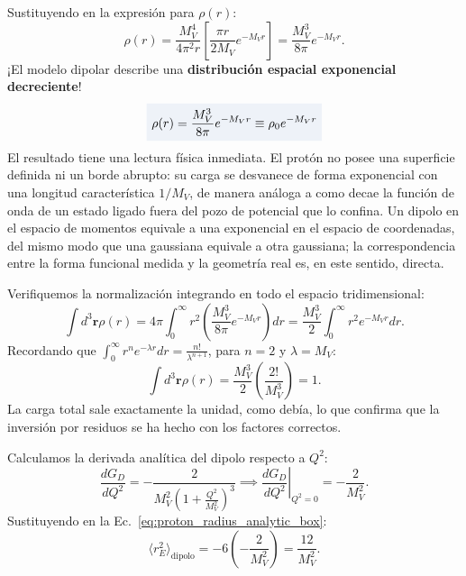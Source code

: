 \documentclass[10pt,a4paper]{article}
\newcommand{\dest}[1]{{\setlength{\fboxsep}{4pt}\colorbox{colordest}{$\displaystyle #1$}}}
\begin{document}
Sustituyendo en la expresión para $\rho(r)$:
\begin{equation}
\rho(r) = \frac{M_V^4}{4\pi^2 r} \left[ \frac{\pi r}{2 M_V} e^{-M_V r} \right] = \frac{M_V^3}{8\pi} e^{-M_V r}.
\end{equation}
¡El modelo dipolar describe una \textbf{distribución espacial exponencial decreciente}!
\begin{equation}
\dest{\rho(r) = \frac{M_V^3}{8\pi} e^{-M_V r} \equiv \rho_0 e^{-M_V r}}
\end{equation}
El resultado tiene una lectura física inmediata. El protón no posee una superficie definida ni un borde abrupto: su carga se desvanece de forma exponencial con una longitud característica $1/M_V$, de manera análoga a como decae la función de onda de un estado ligado fuera del pozo de potencial que lo confina. Un dipolo en el espacio de momentos equivale a una exponencial en el espacio de coordenadas, del mismo modo que una gaussiana equivale a otra gaussiana; la correspondencia entre la forma funcional medida y la geometría real es, en este sentido, directa.

Verifiquemos la normalización integrando en todo el espacio tridimensional:
\begin{equation}
\int d^3\mathbf{r} \rho(r) = 4\pi \int_0^\infty r^2 \left( \frac{M_V^3}{8\pi} e^{-M_V r} \right) dr = \frac{M_V^3}{2} \int_0^\infty r^2 e^{-M_V r} dr.
\end{equation}
Recordando que $\int_0^\infty r^n e^{-\lambda r} dr = \frac{n!}{\lambda^{n+1}}$, para $n=2$ y $\lambda = M_V$:
\begin{equation}
\int d^3\mathbf{r} \rho(r) = \frac{M_V^3}{2} \left( \frac{2!}{M_V^3} \right) = 1.
\end{equation}
La carga total sale exactamente la unidad, como debía, lo que confirma que la inversión por residuos se ha hecho con los factores correctos.

Calculamos la derivada analítica del dipolo respecto a $Q^2$:
\begin{equation}
\frac{d G_D}{d Q^2} = -\frac{2}{M_V^2 \left( 1 + \frac{Q^2}{M_V^2} \right)^3} \implies \left. \frac{d G_D}{d Q^2} \right|_{Q^2 = 0} = -\frac{2}{M_V^2}.
\end{equation}
Sustituyendo en la Ec.~\eqref{eq:proton_radius_analytic_box}:
\begin{equation}
\langle r_E^2 \rangle_{\text{dipolo}} = -6 \left( -\frac{2}{M_V^2} \right) = \frac{12}{M_V^2}.
\label{eq:rE2_momento_deriv}
\end{equation}
\end{document}
